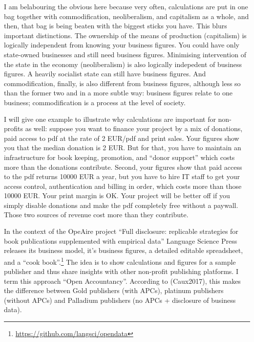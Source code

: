 \documentclass[12pt]{article}
\newcommand{\citet}[1]{(#1)}
\begin{document}
I am belabouring the obvious here because very often, calculations are put in one bag together with commodification, neoliberalism, and capitalism as a whole, and then, that bag is being beaten  with the biggest sticks you have. This blurs important distinctions. The ownership of the means of production (capitalism) is logically independent from knowing your business figures. You could have only state-owned businesses and still need business figures. Minimising intervention of the state in the economy (neoliberalism) is also logically indepedent of business figures. A heavily socialist state can still have business figures. And commodification, finally, is also different from business figures, although less so than the former two and in a more subtle way: business figures relate to one business; commodification is a process at the level of society.

I will give one example to illustrate why calculations are important for non-profits as well: suppose you want to finance your project by a mix of donations, paid access to pdf at the rate of 2 EUR/pdf and print sales. Your figures show you that the median donation is 2 EUR. But for that, you have to maintain an infrastructure for book keeping, promotion, and ``donor support'' which costs more than the donations contribute. Second, your figures show that paid access to the pdf returns 10000 EUR a year, but you have to hire IT staff to get your access control, authentication and billing in order, which costs more than those 10000 EUR. Your print margin is OK. Your project will be better off if you simply disable donations and make the pdf completely free without a paywall. Those two sources of revenue cost more than they contribute. 

In the context of the OpeAire project ``Full disclosure: replicable strategies for book publications supplemented with empirical data'' Language Science Press releases its business model, it's business figures, a detailed editable spreadsheet, and a ``cook book''.\footnote{\url{https://github.com/langsci/opendata}} The idea is to show calculations and figures for a sample publisher and thus share insights with other non-profit publishing platforms. I term this approach ``Open Accountancy''. According to \citet{Caux2017}, this makes the difference between Gold publishers (with APCs), platinum publishers (without APCs) and Palladium publishers (no APCs + disclosure of business data). 
\end{document}
